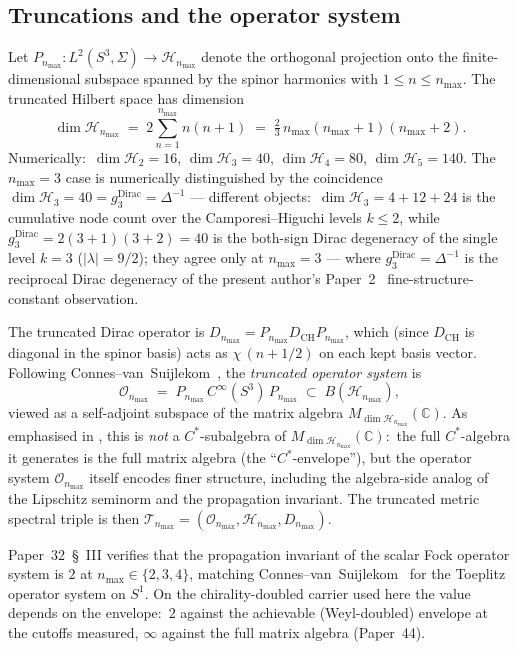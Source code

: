 \documentclass[11pt,a4paper]{article}
\theoremstyle{plain}
\theoremstyle{definition}
\newcommand{\nmax}{n_{\max}}
\newcommand{\sthree}{S^{3}}
\newcommand{\Hilb}{\mathcal{H}}
\newcommand{\Op}{\mathcal{O}}
\newcommand{\Tcal}{\mathcal{T}}
\newcommand{\C}{\mathbb{C}}
\newcommand{\Mat}{M}
\newcommand{\DCH}{D_{\mathrm{CH}}}
\begin{document}
\subsection{Truncations and the operator system}
\label{sec:truncations_recap}

Let $P_{\nmax}: L^2(\sthree, \Sigma) \to \Hilb_{\nmax}$ denote the
orthogonal projection onto the finite-dimensional subspace spanned by
the spinor harmonics with $1 \le n \le \nmax$. The truncated Hilbert
space has dimension
\begin{equation}\label{eq:dim_H_nmax}
   \dim \Hilb_{\nmax}
   \;=\; 2 \sum_{n=1}^{\nmax} n(n+1)
   \;=\; \tfrac{2}{3}\, \nmax(\nmax+1)(\nmax+2).
\end{equation}
Numerically:\ $\dim \Hilb_2 = 16$, $\dim \Hilb_3 = 40$,
$\dim \Hilb_4 = 80$, $\dim \Hilb_5 = 140$. The $\nmax = 3$ case is
numerically distinguished by the coincidence $\dim \Hilb_3 = 40 =
g_3^{\mathrm{Dirac}} = \Delta^{-1}$ --- different objects:\
$\dim \Hilb_3 = 4 + 12 + 24$ is the cumulative node count over the
Camporesi--Higuchi levels $k \le 2$, while $g_3^{\mathrm{Dirac}} =
2(3+1)(3+2) = 40$ is the both-sign Dirac degeneracy of the single
level $k = 3$ ($|\lambda| = 9/2$); they agree only at $\nmax = 3$ ---
where $g_3^{\mathrm{Dirac}} = \Delta^{-1}$ is the reciprocal Dirac
degeneracy of the present author's Paper~2~\cite{paper2}
fine-structure-constant observation.

The truncated Dirac operator is $D_{\nmax} = P_{\nmax} \DCH P_{\nmax}$,
which (since $\DCH$ is diagonal in the spinor basis) acts as
$\chi\,(n + 1/2)$ on each kept basis vector. Following
Connes--van~Suijlekom~\cite{connes_vs2021}, the \emph{truncated
operator system} is
\begin{equation}\label{eq:O_def}
   \Op_{\nmax}
   \;=\; P_{\nmax}\, C^\infty(\sthree)\, P_{\nmax}
   \;\subset\; B(\Hilb_{\nmax}),
\end{equation}
viewed as a self-adjoint subspace of the matrix algebra
$\Mat_{\dim \Hilb_{\nmax}}(\C)$. As emphasised in
\cite[\S 1]{connes_vs2021}, this is \emph{not} a $C^*$-subalgebra of
$\Mat_{\dim \Hilb_{\nmax}}(\C)$:\ the full $C^*$-algebra it generates
is the full matrix algebra (the ``$C^*$-envelope''), but the operator
system $\Op_{\nmax}$ itself encodes finer structure, including the
algebra-side analog of the Lipschitz seminorm and the propagation
invariant. The truncated metric spectral triple is then
$\Tcal_{\nmax} = (\Op_{\nmax}, \Hilb_{\nmax}, D_{\nmax})$.

Paper~32~\S~III verifies that the propagation invariant of the scalar
Fock operator system is $2$ at $\nmax \in \{2, 3, 4\}$, matching
Connes--van~Suijlekom~\cite[\S 4]{connes_vs2021} for the
Toeplitz operator system on $S^1$. On the chirality-doubled carrier
used here the value depends on the envelope:\ $2$ against the
achievable (Weyl-doubled) envelope at the cutoffs measured, $\infty$
against the full matrix algebra (Paper~44).
\end{document}
